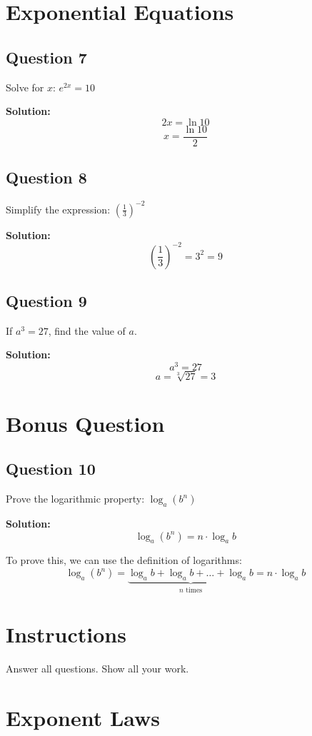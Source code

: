 \documentclass[12pt]{article}
\begin{document}
\section*{Exponential Equations}

\subsection*{Question 7}
Solve for $x$: $e^{2x} = 10$

\textbf{Solution:}
\[2x = \ln 10\]
\[x = \frac{\ln 10}{2}\]

\subsection*{Question 8}
Simplify the expression: $\left(\frac{1}{3}\right)^{-2}$

\textbf{Solution:}
\[\left(\frac{1}{3}\right)^{-2} = 3^2 = 9\]

\subsection*{Question 9}
If $a^3 = 27$, find the value of $a$.

\textbf{Solution:}
\[a^3 = 27\]
\[a = \sqrt[3]{27} = 3\]

\section*{Bonus Question}

\subsection*{Question 10}
Prove the logarithmic property: $\log_a (b^n)$

\textbf{Solution:}
\[\log_a (b^n) = n \cdot \log_a b\]

To prove this, we can use the definition of logarithms:
\[\log_a (b^n) = \underbrace{\log_a b + \log_a b + \ldots + \log_a b}_{n \text{ times}} = n \cdot \log_a b\]
\newpage
\section*{Instructions}
Answer all questions. Show all your work.

\section*{Exponent Laws}
\end{document}

